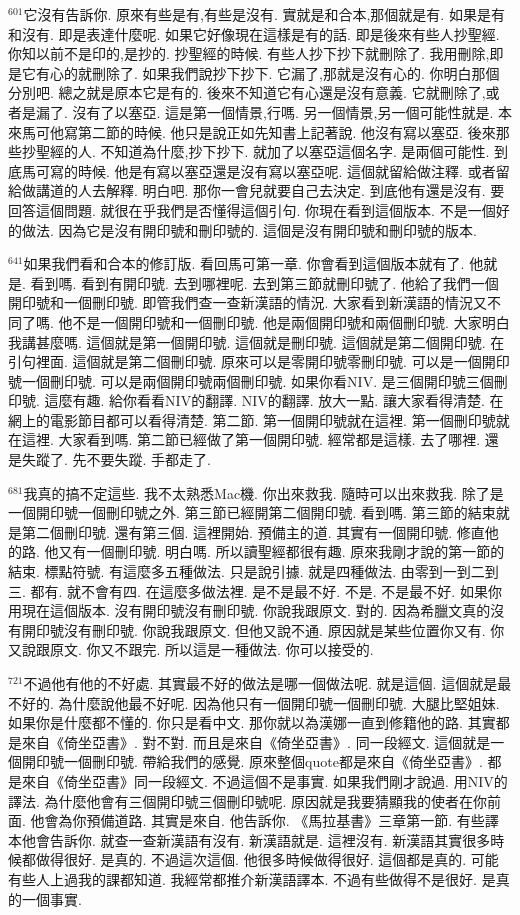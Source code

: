 \documentclass{book}
\begin{document}
$^{601}$它沒有告訴你.
原來有些是有,有些是沒有.
實就是和合本,那個就是有.
如果是有和沒有.
即是表達什麼呢.
如果它好像現在這樣是有的話.
即是後來有些人抄聖經.
你知以前不是印的,是抄的.
抄聖經的時候.
有些人抄下抄下就刪除了.
我用刪除,即是它有心的就刪除了.
如果我們說抄下抄下.
它漏了,那就是沒有心的.
你明白那個分別吧.
總之就是原本它是有的.
後來不知道它有心還是沒有意義.
它就刪除了,或者是漏了.
沒有了以塞亞.
這是第一個情景,行嗎.
另一個情景,另一個可能性就是.
本來馬可他寫第二節的時候.
他只是說正如先知書上記著說.
他沒有寫以塞亞.
後來那些抄聖經的人.
不知道為什麼,抄下抄下.
就加了以塞亞這個名字.
是兩個可能性.
到底馬可寫的時候.
他是有寫以塞亞還是沒有寫以塞亞呢.
這個就留給做注釋.
或者留給做講道的人去解釋.
明白吧.
那你一會兒就要自己去決定.
到底他有還是沒有.
要回答這個問題.
就很在乎我們是否懂得這個引句.
你現在看到這個版本.
不是一個好的做法.
因為它是沒有開印號和刪印號的.
這個是沒有開印號和刪印號的版本.

$^{641}$如果我們看和合本的修訂版.
看回馬可第一章.
你會看到這個版本就有了.
他就是.
看到嗎.
看到有開印號.
去到哪裡呢.
去到第三節就刪印號了.
他給了我們一個開印號和一個刪印號.
即管我們查一查新漢語的情況.
大家看到新漢語的情況又不同了嗎.
他不是一個開印號和一個刪印號.
他是兩個開印號和兩個刪印號.
大家明白我講甚麼嗎.
這個就是第一個開印號.
這個就是刪印號.
這個就是第二個開印號.
在引句裡面.
這個就是第二個刪印號.
原來可以是零開印號零刪印號.
可以是一個開印號一個刪印號.
可以是兩個開印號兩個刪印號.
如果你看NIV.
是三個開印號三個刪印號.
這麼有趣.
給你看看NIV的翻譯.
NIV的翻譯.
放大一點.
讓大家看得清楚.
在網上的電影節目都可以看得清楚.
第二節.
第一個開印號就在這裡.
第一個刪印號就在這裡.
大家看到嗎.
第二節已經做了第一個開印號.
經常都是這樣.
去了哪裡.
還是失蹤了.
先不要失蹤.
手都走了.

$^{681}$我真的搞不定這些.
我不太熟悉Mac機.
你出來救我.
隨時可以出來救我.
除了是一個開印號一個刪印號之外.
第三節已經開第二個開印號.
看到嗎.
第三節的結束就是第二個刪印號.
還有第三個.
這裡開始.
預備主的道.
其實有一個開印號.
修直他的路.
他又有一個刪印號.
明白嗎.
所以讀聖經都很有趣.
原來我剛才說的第一節的結束.
標點符號.
有這麼多五種做法.
只是說引據.
就是四種做法.
由零到一到二到三.
都有.
就不會有四.
在這麼多做法裡.
是不是最不好.
不是.
不是最不好.
如果你用現在這個版本.
沒有開印號沒有刪印號.
你說我跟原文.
對的.
因為希臘文真的沒有開印號沒有刪印號.
你說我跟原文.
但他又說不通.
原因就是某些位置你又有.
你又說跟原文.
你又不跟完.
所以這是一種做法.
你可以接受的.

$^{721}$不過他有他的不好處.
其實最不好的做法是哪一個做法呢.
就是這個.
這個就是最不好的.
為什麼說他最不好呢.
因為他只有一個開印號一個刪印號.
大腿比堅姐妹.
如果你是什麼都不懂的.
你只是看中文.
那你就以為漢娜一直到修籍他的路.
其實都是來自《倚坐亞書》.
對不對.
而且是來自《倚坐亞書》.
同一段經文.
這個就是一個開印號一個刪印號.
帶給我們的感覺.
原來整個quote都是來自《倚坐亞書》.
都是來自《倚坐亞書》同一段經文.
不過這個不是事實.
如果我們剛才說過.
用NIV的譯法.
為什麼他會有三個開印號三個刪印號呢.
原因就是我要猜顯我的使者在你前面.
他會為你預備道路.
其實是來自.
他告訴你.
《馬拉基書》三章第一節.
有些譯本他會告訴你.
就查一查新漢語有沒有.
新漢語就是.
這裡沒有.
新漢語其實很多時候都做得很好.
是真的.
不過這次這個.
他很多時候做得很好.
這個都是真的.
可能有些人上過我的課都知道.
我經常都推介新漢語譯本.
不過有些做得不是很好.
是真的一個事實.
\end{document}

